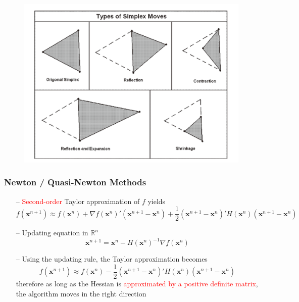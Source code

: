 \documentclass[aspectratio=169, 11pt]{beamer}
\begin{document}
\begin{frame}
  \begin{figure}
    \centering
    \includegraphics[width = 4.5in]{Nelder_Mead.png}
  \end{figure}
\end{frame}

\begin{frame}
\frametitle{Newton / Quasi-Newton Methods}
  \begin{itemize}
    \item[--] \textcolor{red}{Second-order} Taylor approximation of $f$ yields
    \[
      f\left(\mathbf{x}^{n+1}\right)\approx f\left(\mathbf{x}^{n}\right)+\nabla f\left(\mathbf{x}^{n}\right)'\left(\mathbf{x}^{n+1}-\mathbf{x}^{n}\right)+\frac{1}{2}\left(\mathbf{x}^{n+1}-\mathbf{x}^{n}\right)'H\left(\mathbf{x}^{n}\right)\left(\mathbf{x}^{n+1}-\mathbf{x}^{n}\right)
    \]
    \bigskip
    \item[--] Updating equation in $\mathbb{R}^n$
    \[
      \mathbf{x}^{n+1}=\mathbf{x}^{n}-H\left(\mathbf{x}^{n}\right)^{-1}\nabla f\left(\mathbf{x}^{n}\right)
    \]
    \bigskip
    \item[--] Using the updating rule, the Taylor approximation becomes
    \[
      f\left(\mathbf{x}^{n+1}\right)\approx f\left(\mathbf{x}^{n}\right)-\frac{1}{2}\left(\mathbf{x}^{n+1}-\mathbf{x}^{n}\right)'H\left(\mathbf{x}^{n}\right)\left(\mathbf{x}^{n+1}-\mathbf{x}^{n}\right)
    \]
    therefore as long as the Hessian is \textcolor{red}{approximated by a positive definite matrix}, the algorithm moves in the right direction
  \end{itemize}
\end{frame}
\end{document}
